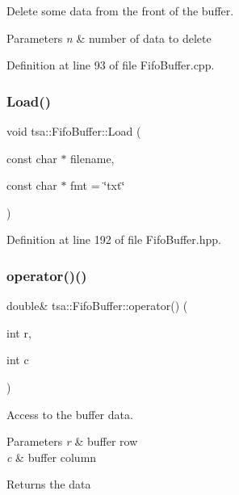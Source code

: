 Delete some data from the front of the buffer.


\begin{DoxyParams}{Parameters}
{\em n} & number of data to delete \\
\hline
\end{DoxyParams}


Definition at line 93 of file Fifo\+Buffer.\+cpp.

\mbox{\label{classtsa_1_1_fifo_buffer_a597548e1842c157dfe1ade0f9e5cd121}} 
\subsubsection{\texorpdfstring{Load()}{Load()}}
{\footnotesize\ttfamily void tsa\+::\+Fifo\+Buffer\+::\+Load (\begin{DoxyParamCaption}\item[{const char $\ast$}]{filename,  }\item[{const char $\ast$}]{fmt = {\ttfamily \char`\"{}txt\char`\"{}} }\end{DoxyParamCaption})\hspace{0.3cm}{\ttfamily [inline]}}



Definition at line 192 of file Fifo\+Buffer.\+hpp.

\mbox{\label{classtsa_1_1_fifo_buffer_a78f313804a23e61fa57329b6a1f3df02}} 
\subsubsection{\texorpdfstring{operator()()}{operator()()}}
{\footnotesize\ttfamily double\& tsa\+::\+Fifo\+Buffer\+::operator() (\begin{DoxyParamCaption}\item[{int}]{r,  }\item[{int}]{c }\end{DoxyParamCaption})\hspace{0.3cm}{\ttfamily [inline]}}

Access to the buffer data.


\begin{DoxyParams}{Parameters}
{\em r} & buffer row \\
\hline
{\em c} & buffer column\\
\hline
\end{DoxyParams}
\begin{DoxyReturn}{Returns}
the data 
\end{DoxyReturn}


